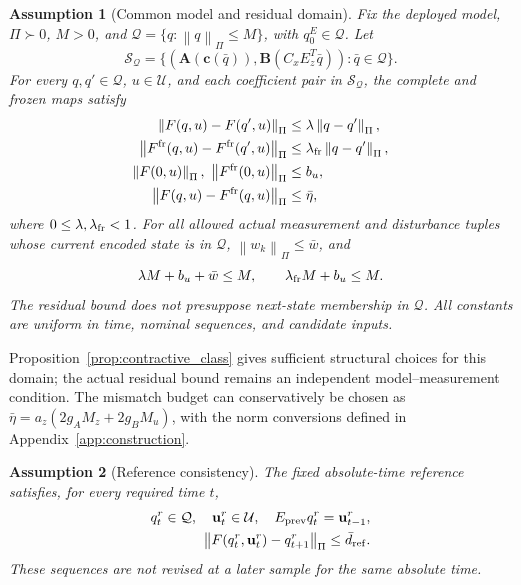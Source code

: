 \documentclass[journal]{IEEEtran}
\newtheorem{assumption}{Assumption}
\newcommand{\vu}{\mathbf{u}}
\newcommand{\vc}{\mathbf{c}}
\newcommand{\mA}{\mathbf{A}}
\newcommand{\mB}{\mathbf{B}}
\newcommand{\norm}[1]{\left\lVert #1\right\rVert}
\begin{document}
\begin{assumption}[Common model and residual domain]
\label{ass:domain}
Fix the deployed model, $\Pi\succ0$, $M>0$, and $\mathcal Q=\{q:\norm{q}_\Pi\le M\}$, with $q_0^E\in\mathcal Q$. Let
\begin{equation}
\mathcal S_{\mathcal Q}=\{(\mA(\vc(\bar q)),\mB(C_xE_z^T\bar q)):
\bar q\in\mathcal Q\}.
\label{eq:frozen_family}
\end{equation}
For every $q,q'\in\mathcal Q$, $u\in\mathcal U$, and each coefficient pair in $\mathcal S_{\mathcal Q}$, the complete and frozen maps satisfy
\begin{align}
\norm{F(q,u)-F(q',u)}_\Pi&\le\lambda\norm{q-q'}_\Pi,\nonumber\\
\norm{F^{\rm fr}(q,u)-F^{\rm fr}(q',u)}_\Pi
&\le\lambda_{\rm fr}\norm{q-q'}_\Pi,\label{eq:common_contraction}\\
\norm{F(0,u)}_\Pi,\ \norm{F^{\rm fr}(0,u)}_\Pi&\le b_u,\nonumber\\
\norm{F(q,u)-F^{\rm fr}(q,u)}_\Pi&\le\bar\eta,\nonumber
\end{align}
where $0\le\lambda,\lambda_{\rm fr}<1$. For all allowed actual measurement and disturbance tuples whose current encoded state is in $\mathcal Q$, $\norm{w_k}_\Pi\le\bar w$, and
\begin{equation}
\lambda M+b_u+\bar w\le M,\qquad
\lambda_{\rm fr}M+b_u\le M.
\label{eq:domain_radius}
\end{equation}
The residual bound does not presuppose next-state membership in $\mathcal Q$. All constants are uniform in time, nominal sequences, and candidate inputs.
\end{assumption}

Proposition~\ref{prop:contractive_class} gives sufficient structural choices for this domain; the actual residual bound remains an independent model--measurement condition. The mismatch budget can conservatively be chosen as $\bar\eta=a_z(2g_A M_z+2g_B M_u)$, with the norm conversions defined in Appendix~\ref{app:construction}.

\begin{assumption}[Reference consistency]
\label{ass:reference}
The fixed absolute-time reference satisfies, for every required time $t$,
\begin{equation}
\begin{split}
q_t^r\in\mathcal Q,\quad \vu_t^r\in\mathcal U,\quad
E_{\rm prev}q_t^r=\vu_{t-1}^r,\\
\norm{F(q_t^r,\vu_t^r)-q_{t+1}^r}_\Pi\le\bar d_{\rm ref}.
\end{split}
\label{eq:reference_defect}
\end{equation}
These sequences are not revised at a later sample for the same absolute time.
\end{assumption}
\end{document}
